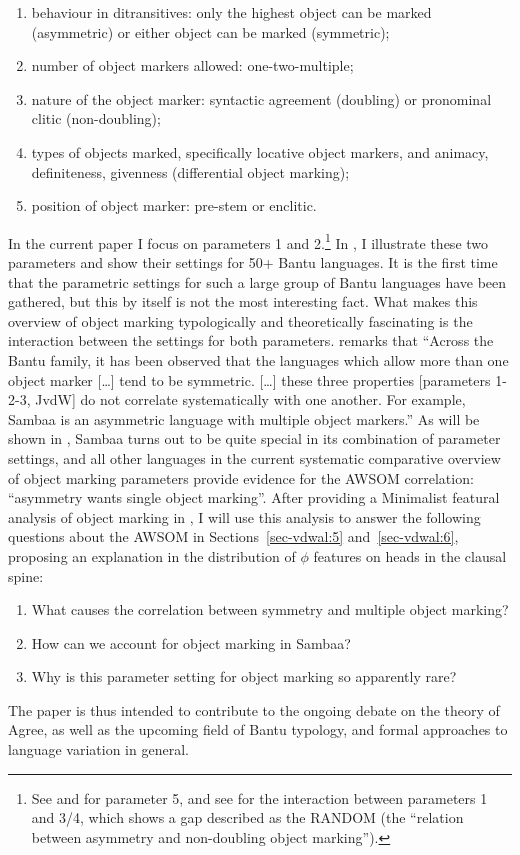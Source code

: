 \documentclass[output=paper
,modfonts
,nonflat]{langsci/langscibook}
\begin{document}
\begin{enumerate}
\item behaviour in ditransitives: only the highest object can be marked (asymmetric) or either object can be marked (symmetric); 
\item number of object markers allowed: one-two-multiple;
\item nature of the object marker: syntactic agreement (doubling) or pronominal clitic (non-doubling);
\item types of objects marked, specifically locative object markers, and animacy, definiteness, givenness (differential object marking);
\item position of object marker: pre-stem or enclitic.
\end{enumerate}
In the current paper I focus on parameters 1 and 2.\footnote{See \citet{Beaudoin-Lietz_et_al2004} and \citet{Marlo2015} for parameter 5, and see \citet{Van_der_Wal2017b} for the interaction between parameters 1 and 3/4, which shows a gap described as the RANDOM (the ``relation between asymmetry and non-doubling object marking'').} 
In , I illustrate these two parameters and show their settings for 50+ Bantu languages. It is the first time that the parametric settings for such a large group of Bantu languages have been gathered, but this by itself is not the most interesting fact. What makes this overview of object marking typologically and theoretically fascinating is the interaction between the settings for both parameters. \citet[78]{Riedel2009} remarks that “Across the Bantu family, it has been observed that the languages which allow more than one object marker […] tend to be symmetric. […] these three properties [parameters 1-2-3, JvdW] do not correlate systematically with one another. For example, Sambaa is an asymmetric language with multiple object markers.” As will be shown in , Sambaa turns out to be quite special in its combination of parameter settings, and all other languages in the current systematic comparative overview of object marking parameters provide evidence for the AWSOM correlation: ``asymmetry wants single object marking''. After providing a Minimalist featural analysis of object marking in , I will use this analysis to answer the following questions about the AWSOM in Sections~\ref{sec-vdwal:5} and~\ref{sec-vdwal:6}, proposing an explanation in the distribution of $\phi$ features on heads in the clausal spine:

\begin{enumerate}
\item What causes the correlation between symmetry and multiple object marking?
\item How can we account for object marking in Sambaa?
\item Why is this parameter setting for object marking so apparently rare?
\end{enumerate}
The paper is thus intended to contribute to the ongoing debate on the theory of Agree, as well as the upcoming field of Bantu typology, and formal approaches to language variation in general.
\end{document}
